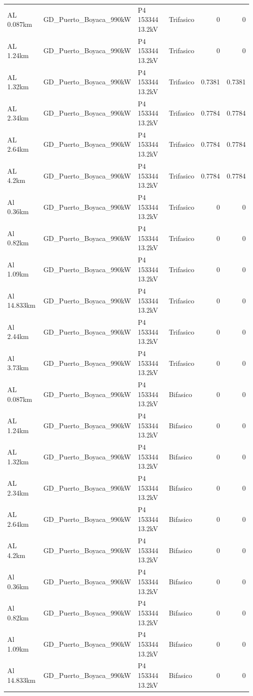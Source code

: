 \documentclass[11pt,a4paper]{article}
\begin{document}
\begin{longtable}{llllrr}
AL 0.087km & GD\_Puerto\_Boyaca\_990kW & P4 153344 13.2kV & Trifasico & 0 & 0 \\
AL 1.24km & GD\_Puerto\_Boyaca\_990kW & P4 153344 13.2kV & Trifasico & 0 & 0 \\
AL 1.32km & GD\_Puerto\_Boyaca\_990kW & P4 153344 13.2kV & Trifasico & 0.7381 & 0.7381 \\
AL 2.34km & GD\_Puerto\_Boyaca\_990kW & P4 153344 13.2kV & Trifasico & 0.7784 & 0.7784 \\
AL 2.64km & GD\_Puerto\_Boyaca\_990kW & P4 153344 13.2kV & Trifasico & 0.7784 & 0.7784 \\
AL 4.2km & GD\_Puerto\_Boyaca\_990kW & P4 153344 13.2kV & Trifasico & 0.7784 & 0.7784 \\
Al 0.36km & GD\_Puerto\_Boyaca\_990kW & P4 153344 13.2kV & Trifasico & 0 & 0 \\
Al 0.82km & GD\_Puerto\_Boyaca\_990kW & P4 153344 13.2kV & Trifasico & 0 & 0 \\
Al 1.09km & GD\_Puerto\_Boyaca\_990kW & P4 153344 13.2kV & Trifasico & 0 & 0 \\
Al 14.833km & GD\_Puerto\_Boyaca\_990kW & P4 153344 13.2kV & Trifasico & 0 & 0 \\
Al 2.44km & GD\_Puerto\_Boyaca\_990kW & P4 153344 13.2kV & Trifasico & 0 & 0 \\
Al 3.73km & GD\_Puerto\_Boyaca\_990kW & P4 153344 13.2kV & Trifasico & 0 & 0 \\
AL 0.087km & GD\_Puerto\_Boyaca\_990kW & P4 153344 13.2kV & Bifasico & 0 & 0 \\
AL 1.24km & GD\_Puerto\_Boyaca\_990kW & P4 153344 13.2kV & Bifasico & 0 & 0 \\
AL 1.32km & GD\_Puerto\_Boyaca\_990kW & P4 153344 13.2kV & Bifasico & 0 & 0 \\
AL 2.34km & GD\_Puerto\_Boyaca\_990kW & P4 153344 13.2kV & Bifasico & 0 & 0 \\
AL 2.64km & GD\_Puerto\_Boyaca\_990kW & P4 153344 13.2kV & Bifasico & 0 & 0 \\
AL 4.2km & GD\_Puerto\_Boyaca\_990kW & P4 153344 13.2kV & Bifasico & 0 & 0 \\
Al 0.36km & GD\_Puerto\_Boyaca\_990kW & P4 153344 13.2kV & Bifasico & 0 & 0 \\
Al 0.82km & GD\_Puerto\_Boyaca\_990kW & P4 153344 13.2kV & Bifasico & 0 & 0 \\
Al 1.09km & GD\_Puerto\_Boyaca\_990kW & P4 153344 13.2kV & Bifasico & 0 & 0 \\
Al 14.833km & GD\_Puerto\_Boyaca\_990kW & P4 153344 13.2kV & Bifasico & 0 & 0 \\

\end{longtable}
\end{document}
